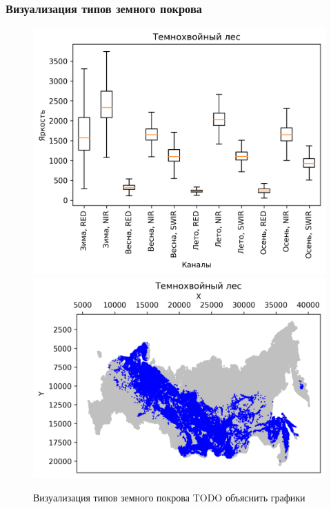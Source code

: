 \documentclass[14pt, a4paper, oneside]{extarticle}
\begin{document}
\subsubsection{Визуализация типов земного покрова}
\begin{figure}[H]
    \caption{Визуализация типов земного покрова TODO объяснить графики}
    \centering
    \includegraphics[]{class-1-boxplot}
    \includegraphics[]{class-1-map}
\end{figure}
\end{document}
